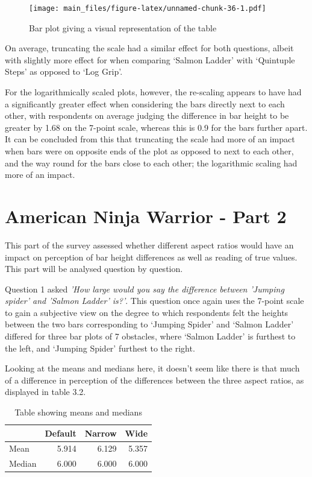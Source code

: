 \documentclass[
  11pt,
]{book}
\begin{document}
\begin{figure}
\centering
\texttt{[image: main\_files/figure-latex/unnamed-chunk-36-1.pdf]}
\caption{Bar plot giving a visual representation of the table}
\end{figure}

On average, truncating the scale had a similar effect for both
questions, albeit with slightly more effect for when comparing `Salmon
Ladder' with `Quintuple Steps' as opposed to `Log Grip'.

\newpage

For the logarithmically scaled plots, however, the re-scaling appears to
have had a significantly greater effect when considering the bars
directly next to each other, with respondents on average judging the
difference in bar height to be greater by 1.68 on the 7-point scale,
whereas this is 0.9 for the bars further apart. It can be concluded from
this that truncating the scale had more of an impact when bars were on
opposite ends of the plot as opposed to next to each other, and the way
round for the bars close to each other; the logarithmic scaling had more
of an impact.

\section{American Ninja Warrior - Part 2}

This part of the survey assessed whether different aspect ratios would
have an impact on perception of bar height differences as well as
reading of true values. This part will be analysed question by question.

Question 1 asked
\textit{'How large would you say the difference between 'Jumping spider' and 'Salmon Ladder' is?'}.
This question once again uses the 7-point scale to gain a subjective
view on the degree to which respondents felt the heights between the two
bars corresponding to `Jumping Spider' and `Salmon Ladder' differed for
three bar plots of 7 obstacles, where `Salmon Ladder' is furthest to the
left, and `Jumping Spider' furthest to the right.

Looking at the means and medians here, it doesn't seem like there is
that much of a difference in perception of the differences between the
three aspect ratios, as displayed in table 3.2.

\begin{table}[!h]

\caption{\label{tab:unnamed-chunk-39}Table showing means and medians}
\centering
\begin{tabular}[t]{l|r|r|r}
\hline
  & Default & Narrow & Wide\\
\hline
Mean & 5.914 & 6.129 & 5.357\\
\hline
Median & 6.000 & 6.000 & 6.000\\
\hline
\end{tabular}
\end{table}
\end{document}
